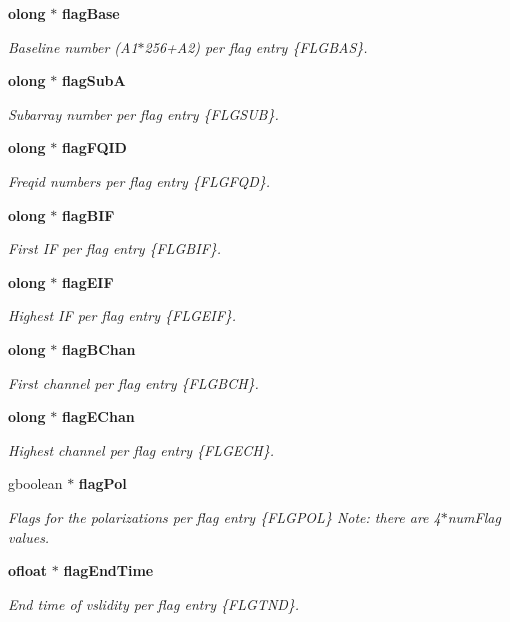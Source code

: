\begin{CompactItemize}
{\bf olong} $\ast$ {\bf flag\-Base}
\begin{CompactList}\small\item\em Baseline number (A1$\ast$256+A2) per flag entry \{FLGBAS\}. \item\end{CompactList}\item 
{\bf olong} $\ast$ {\bf flag\-Sub\-A}
\begin{CompactList}\small\item\em Subarray number per flag entry \{FLGSUB\}. \item\end{CompactList}\item 
{\bf olong} $\ast$ {\bf flag\-FQID}
\begin{CompactList}\small\item\em Freqid numbers per flag entry \{FLGFQD\}. \item\end{CompactList}\item 
{\bf olong} $\ast$ {\bf flag\-BIF}
\begin{CompactList}\small\item\em First IF per flag entry \{FLGBIF\}. \item\end{CompactList}\item 
{\bf olong} $\ast$ {\bf flag\-EIF}
\begin{CompactList}\small\item\em Highest IF per flag entry \{FLGEIF\}. \item\end{CompactList}\item 
{\bf olong} $\ast$ {\bf flag\-BChan}
\begin{CompactList}\small\item\em First channel per flag entry \{FLGBCH\}. \item\end{CompactList}\item 
{\bf olong} $\ast$ {\bf flag\-EChan}
\begin{CompactList}\small\item\em Highest channel per flag entry \{FLGECH\}. \item\end{CompactList}\item 
gboolean $\ast$ {\bf flag\-Pol}
\begin{CompactList}\small\item\em Flags for the polarizations per flag entry \{FLGPOL\} Note: there are 4$\ast$num\-Flag values. \item\end{CompactList}\item 
{\bf ofloat} $\ast$ {\bf flag\-End\-Time}
\begin{CompactList}\small\item\em End time of vslidity per flag entry \{FLGTND\}. \item\end{CompactList}\end{CompactItemize}


